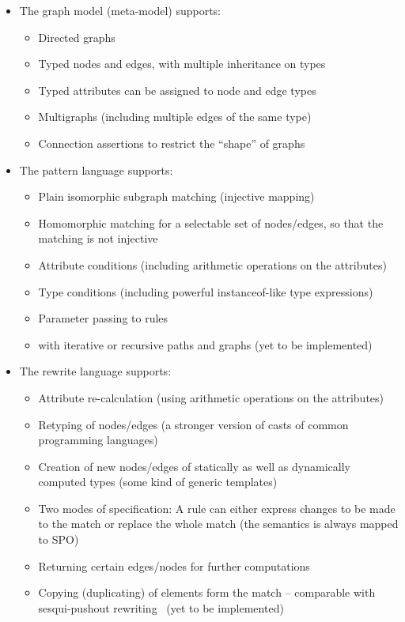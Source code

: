 \begin{itemize}
  \item The graph model (meta-model) supports:
  \begin{itemize}
    \item Directed graphs
    \item Typed nodes and edges, with multiple inheritance on types
    \item Typed attributes can be assigned to node and edge types
    \item Multigraphs (including multiple edges of the same type)
    \item Connection assertions to restrict the ``shape'' of graphs
  \end{itemize}
  
  \item The pattern language supports:
  \begin{itemize}
    \item Plain isomorphic subgraph matching (injective mapping)
    \item Homomorphic matching for a selectable set of nodes/edges, so that the matching is not injective
    \item Attribute conditions (including arithmetic operations on the attributes)
    \item Type conditions (including powerful instanceof-like type expressions)
    \item Parameter passing to rules
    \item {} with iterative or recursive paths and graphs (yet to be implemented)
  \end{itemize}
  
  \item The rewrite language supports:
  \begin{itemize}
    \item Attribute re-calculation (using arithmetic operations on the attributes)
    \item Retyping of nodes/edges (a stronger version of casts of common programming languages)
    \item Creation of new nodes/edges of statically as well as dynamically computed types (some kind of generic templates)
    \item Two modes of specification: A rule can either express changes to be made to the match or replace the whole match (the semantics is always mapped to SPO)
    \item Returning certain edges/nodes for further computations
	  \item Copying (duplicating) of elements form the match -- comparable with sesqui-pushout rewriting~\cite{CHHK:06} (yet to be implemented)
  \end{itemize}
  

\end{itemize}
